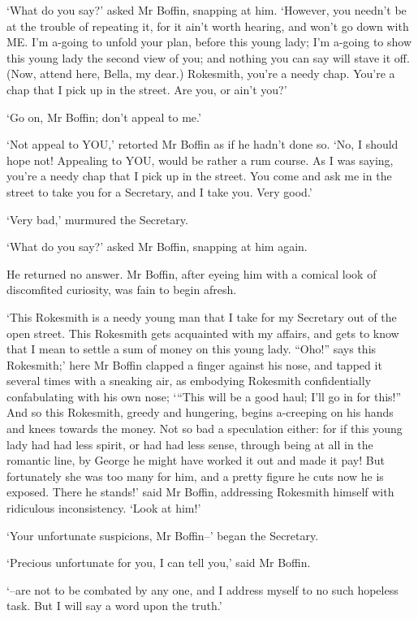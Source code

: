 ‘What do you say?’ asked Mr Boffin, snapping at him. ‘However, you
needn’t be at the trouble of repeating it, for it ain’t worth hearing,
and won’t go down with ME. I’m a-going to unfold your plan, before this
young lady; I’m a-going to show this young lady the second view of you;
and nothing you can say will stave it off. (Now, attend here, Bella, my
dear.) Rokesmith, you’re a needy chap. You’re a chap that I pick up in
the street. Are you, or ain’t you?’

‘Go on, Mr Boffin; don’t appeal to me.’

‘Not appeal to YOU,’ retorted Mr Boffin as if he hadn’t done so. ‘No,
I should hope not! Appealing to YOU, would be rather a rum course. As I
was saying, you’re a needy chap that I pick up in the street. You come
and ask me in the street to take you for a Secretary, and I take you.
Very good.’

‘Very bad,’ murmured the Secretary.

‘What do you say?’ asked Mr Boffin, snapping at him again.

He returned no answer. Mr Boffin, after eyeing him with a comical look
of discomfited curiosity, was fain to begin afresh.

‘This Rokesmith is a needy young man that I take for my Secretary out
of the open street. This Rokesmith gets acquainted with my affairs, and
gets to know that I mean to settle a sum of money on this young lady.
“Oho!” says this Rokesmith;’ here Mr Boffin clapped a finger against
his nose, and tapped it several times with a sneaking air, as embodying
Rokesmith confidentially confabulating with his own nose; ‘“This will
be a good haul; I’ll go in for this!” And so this Rokesmith, greedy and
hungering, begins a-creeping on his hands and knees towards the money.
Not so bad a speculation either: for if this young lady had had less
spirit, or had had less sense, through being at all in the romantic
line, by George he might have worked it out and made it pay! But
fortunately she was too many for him, and a pretty figure he cuts now
he is exposed. There he stands!’ said Mr Boffin, addressing Rokesmith
himself with ridiculous inconsistency. ‘Look at him!’

‘Your unfortunate suspicions, Mr Boffin--’ began the Secretary.

‘Precious unfortunate for you, I can tell you,’ said Mr Boffin.

‘--are not to be combated by any one, and I address myself to no such
hopeless task. But I will say a word upon the truth.’

